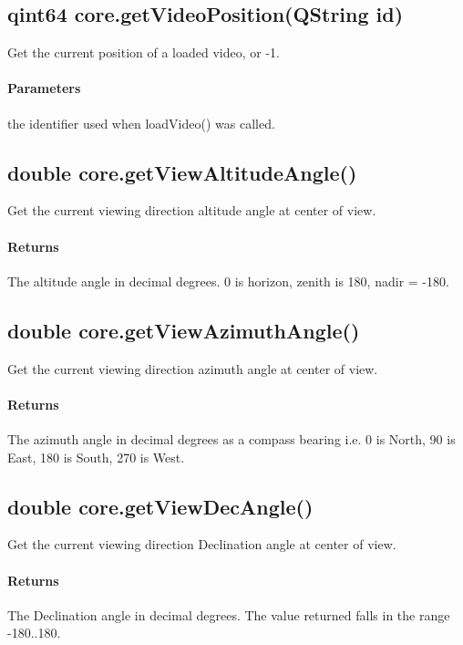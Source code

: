 \subsection{qint64 core.getVideoPosition(QString id)}
\label{sec:ScriptingAPI:core:getVideoPosition}
Get the current position of a loaded video, or -1.

\paragraph{Parameters}
\begin{description}[align=right,labelwidth=3cm,leftmargin=3.2cm]
\item[\parameter{id}] the identifier used when loadVideo() was called.
\end{description}

\subsection{double core.getViewAltitudeAngle()}
\label{sec:ScriptingAPI:core:getViewAltitudeAngle}
Get the current viewing direction altitude angle at center of view.

\paragraph{Returns}
The altitude angle in decimal degrees. 0 is horizon, zenith is 180, nadir = -180.

\subsection{double core.getViewAzimuthAngle()}
\label{sec:ScriptingAPI:core:getViewAzimuthAngle}
Get the current viewing direction azimuth angle at center of view.

\paragraph{Returns}
The azimuth angle in decimal degrees as a compass bearing i.e. 0 is North, 90 is East, 180 is South, 270 is West.

\subsection{double core.getViewDecAngle()}
\label{sec:ScriptingAPI:core:getViewDecAngle}
Get the current viewing direction Declination angle at center of view.

\paragraph{Returns}
The Declination angle in decimal degrees. The value returned falls in the range -180..180.


